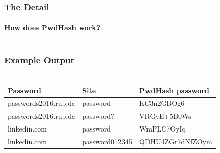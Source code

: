 \documentclass[handout, notes=hide]{beamer}
\begin{document}
\begin{frame}
\frametitle{The Detail}
\framesubtitle{How does PwdHash work?}
\setlength{\parskip}{0.5em}

\begin{columns}[T]
\begin{column}[T]{1.0\textwidth}



\end{column}
\end{columns}


\end{frame}


\begin{frame}
\frametitle{Example Output}
\framesubtitle{}
\setlength{\parskip}{0.5em}

\begin{columns}[T]
\begin{column}[T]{1.0\textwidth}
\setlength{\parskip}{0.5em}

\renewcommand{\arraystretch}{1.5}
\begin{tabular}{l|l|l}
{\bf Password} & {\bf Site} & {\bf PwdHash password} \\ \hline
passwords2016.rub.de & password & KC3n2GBOg6 \\
passwords2016.rub.de & password? & VRGyE+5B0Ws \\
linkedin.com & password & WmPLC7OyIq \\
linkedin.com & password012345 & QDHU4ZGr7dNfZOym \\
\end{tabular}
\end{column}
\end{columns}

\end{frame}
\note{
\setlength{\parskip}{0.5em}
}

\end{document}
